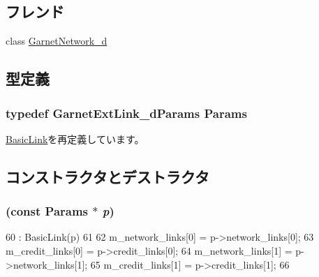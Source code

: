 \subsection*{フレンド}
\begin{DoxyCompactItemize}
\item 
class \hyperlink{classGarnetExtLink__d_a38cee00c4f7913bbde36a9724f8d4075}{GarnetNetwork\_\-d}
\end{DoxyCompactItemize}


\subsection{型定義}
\hypertarget{classGarnetExtLink__d_a6260fe1aace0793dc83922905dbd435f}{
\subsubsection[{Params}]{\setlength{\rightskip}{0pt plus 5cm}typedef GarnetExtLink\_\-dParams {\bf Params}}}
\label{classGarnetExtLink__d_a6260fe1aace0793dc83922905dbd435f}


\hyperlink{classBasicLink_a2c371814143f1675a601e935bfbd756c}{BasicLink}を再定義しています。

\subsection{コンストラクタとデストラクタ}
\hypertarget{classGarnetExtLink__d_a302fc1fbef96df5cd9992b1cf9326bf7}{
\subsubsection[{GarnetExtLink\_\-d}]{ (const {\bf Params} $\ast$ {\em p})}}
\label{classGarnetExtLink__d_a302fc1fbef96df5cd9992b1cf9326bf7}



\begin{DoxyCode}
60     : BasicLink(p)
61 {
62     m_network_links[0] = p->network_links[0];
63     m_credit_links[0] = p->credit_links[0];
64     m_network_links[1] = p->network_links[1];
65     m_credit_links[1] = p->credit_links[1];
66 }
\end{DoxyCode}


